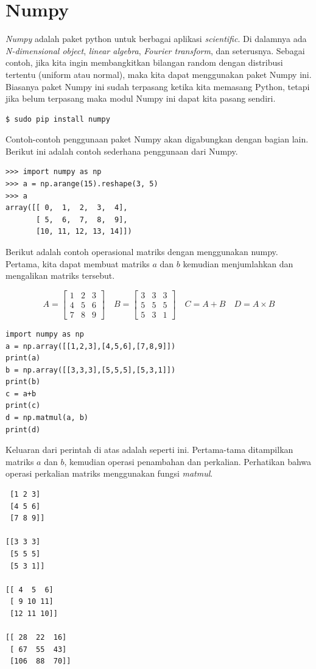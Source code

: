 \section{Numpy}
{\em Numpy} adalah paket python untuk berbagai aplikasi {\em scientific}.
Di dalamnya ada {\em N-dimensional object}, {\em linear algebra},
{\em Fourier transform}, dan seterusnya.
Sebagai contoh, jika kita ingin membangkitkan bilangan random dengan 
distribusi tertentu (uniform atau normal), maka kita dapat menggunakan 
paket Numpy ini.
Biasanya paket Numpy ini sudah terpasang ketika kita memasang Python,
tetapi jika belum terpasang maka modul Numpy ini dapat kita pasang sendiri.

\begin{verbatim}
$ sudo pip install numpy
\end{verbatim}

Contoh-contoh penggunaan paket Numpy akan digabungkan dengan bagian lain.
Berikut ini adalah contoh sederhana penggunaan dari Numpy.

\begin{verbatim}
>>> import numpy as np
>>> a = np.arange(15).reshape(3, 5)
>>> a
array([[ 0,  1,  2,  3,  4],
       [ 5,  6,  7,  8,  9],
       [10, 11, 12, 13, 14]])
\end{verbatim}

Berikut adalah contoh operasional matriks dengan menggunakan numpy.
Pertama, kita dapat membuat matriks $a$ dan $b$ kemudian menjumlahkan
dan mengalikan matriks tersebut.

\begin{equation*}
   A = 
   \begin{bmatrix}
   1 & 2 & 3 \\
   4 & 5 & 6 \\
   7 & 8 & 9
   \end{bmatrix}
   \quad
   B =
   \begin{bmatrix}
   3 & 3 & 3 \\
   5 & 5 & 5 \\
   5 & 3 & 1
   \end{bmatrix}
   \quad
   C = A+B
   \quad
   D = A \times B
\end{equation*}


\begin{verbatim}
import numpy as np
a = np.array([[1,2,3],[4,5,6],[7,8,9]])
print(a)
b = np.array([[3,3,3],[5,5,5],[5,3,1]])
print(b)
c = a+b
print(c)
d = np.matmul(a, b)
print(d)
\end{verbatim}

Keluaran dari perintah di atas adalah seperti ini. Pertama-tama ditampilkan
matriks $a$ dan $b$, kemudian operasi penambahan dan perkalian.
Perhatikan bahwa operasi perkalian matriks menggunakan fungsi {\em matmul}.
\begin{verbatim}
 [1 2 3]
 [4 5 6]
 [7 8 9]]

[[3 3 3]
 [5 5 5]
 [5 3 1]]

[[ 4  5  6]
 [ 9 10 11]
 [12 11 10]]

[[ 28  22  16]
 [ 67  55  43]
 [106  88  70]]
\end{verbatim}


